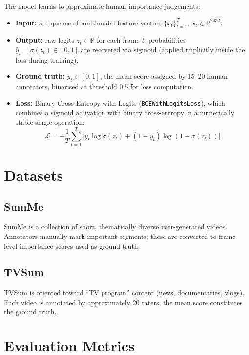 \documentclass[12pt, a4paper]{report}
\begin{document}
The model learns to approximate human importance judgements:
\begin{itemize}[leftmargin=1.5cm]
  \item \textbf{Input:} a sequence of multimodal feature vectors
        $\{x_t\}_{t=1}^{T}$, $x_t \in \mathbb{R}^{2432}$.
  \item \textbf{Output:} raw logits $z_t \in \mathbb{R}$ for each frame $t$;
        probabilities $\hat{y}_t = \sigma(z_t) \in [0,1]$ are recovered via sigmoid
        (applied implicitly inside the loss during training).
  \item \textbf{Ground truth:} $y_t \in [0,1]$, the mean score assigned by 15--20
        human annotators, binarised at threshold $0.5$ for loss computation.
  \item \textbf{Loss:} Binary Cross-Entropy with Logits (\texttt{BCEWithLogitsLoss}),
        which combines a sigmoid activation with binary cross-entropy in a numerically
        stable single operation:
        \begin{equation}
          \mathcal{L} = -\frac{1}{T}\sum_{t=1}^{T}
            \bigl[y_t \log\sigma(z_t) + (1-y_t)\log(1-\sigma(z_t))\bigr]
        \end{equation}
\end{itemize}

\section{Datasets}

\subsection{SumMe \cite{gygli2014}}
SumMe is a collection of short, thematically diverse user-generated videos.
Annotators manually mark important segments; these are converted to frame-level
importance scores used as ground truth.

\subsection{TVSum \cite{song2015}}
TVSum is oriented toward ``TV program'' content (news, documentaries, vlogs). Each
video is annotated by approximately 20 raters; the mean score constitutes the ground
truth.

\section{Evaluation Metrics}
\end{document}
